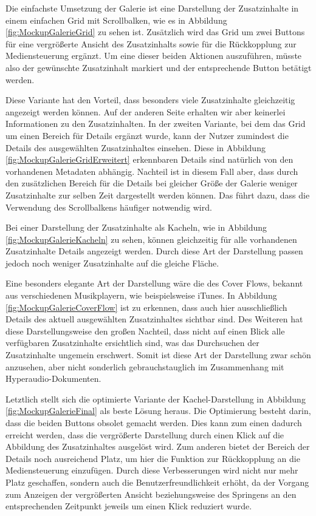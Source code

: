 Die einfachste Umsetzung der Galerie ist eine Darstellung der Zusatzinhalte in einem einfachen Grid  mit Scrollbalken, wie es in Abbildung \ref{fig:MockupGalerieGrid} zu sehen ist. Zusätzlich wird das Grid um zwei Buttons für eine vergrößerte Ansicht des Zusatzinhalts sowie für die Rückkopplung zur Mediensteuerung ergänzt. Um eine dieser beiden Aktionen auszuführen, müsste also der gewünschte Zusatzinhalt markiert und der entsprechende Button betätigt werden.

Diese Variante hat den Vorteil, dass besonders viele Zusatzinhalte gleichzeitig angezeigt werden können. Auf der anderen Seite erhalten wir aber keinerlei Informationen zu den Zusatzinhalten. In der zweiten Variante, bei dem das Grid um einen Bereich für Details ergänzt wurde, kann der Nutzer zumindest die Details des ausgewählten Zusatzinhaltes einsehen. Diese in Abbildung \ref{fig:MockupGalerieGridErweitert} erkennbaren Details sind natürlich von den vorhandenen Metadaten abhängig. Nachteil ist in diesem Fall aber, dass durch den zusätzlichen Bereich für die Details bei gleicher Größe der Galerie weniger Zusatzinhalte zur selben Zeit dargestellt werden können. Das führt dazu, dass die Verwendung des Scrollbalkens häufiger notwendig wird.

Bei einer Darstellung der Zusatzinhalte als Kacheln, wie in Abbildung \ref{fig:MockupGalerieKacheln} zu sehen, können gleichzeitig für alle vorhandenen Zusatzinhalte Details angezeigt werden. Durch diese Art der Darstellung passen jedoch noch weniger Zusatzinhalte auf die gleiche Fläche.

Eine besonders elegante Art der Darstellung wäre die des Cover Flows, bekannt aus verschiedenen Musikplayern, wie beispielsweise iTunes. In Abbildung \ref{fig:MockupGalerieCoverFlow} ist zu erkennen, dass auch hier ausschließlich Details des aktuell ausgewählten Zusatzinhaltes sichtbar sind. Des Weiteren hat diese Darstellungsweise den großen Nachteil, dass nicht auf einen Blick alle verfügbaren Zusatzinhalte ersichtlich sind, was das Durchsuchen der Zusatzinhalte ungemein erschwert. Somit ist diese Art der Darstellung zwar schön anzusehen, aber nicht sonderlich gebrauchstauglich im Zusammenhang mit Hyperaudio-Dokumenten.

Letztlich stellt sich die optimierte Variante der Kachel-Darstellung in Abbildung \ref{fig:MockupGalerieFinal} als beste Lösung heraus. Die Optimierung besteht darin, dass die beiden Buttons obsolet gemacht werden. Dies kann zum einen dadurch erreicht werden, dass die vergrößerte Darstellung durch einen Klick auf die Abbildung des Zusatzinhaltes ausgelöst wird. Zum anderen bietet der Bereich der Details noch ausreichend Platz, um hier die Funktion zur Rückkopplung an die Mediensteuerung einzufügen. Durch diese Verbesserungen wird nicht nur mehr Platz geschaffen, sondern auch die Benutzerfreundlichkeit erhöht, da der Vorgang zum Anzeigen der vergrößerten Ansicht beziehungsweise des Springens an den entsprechenden Zeitpunkt jeweils um einen Klick reduziert wurde.

